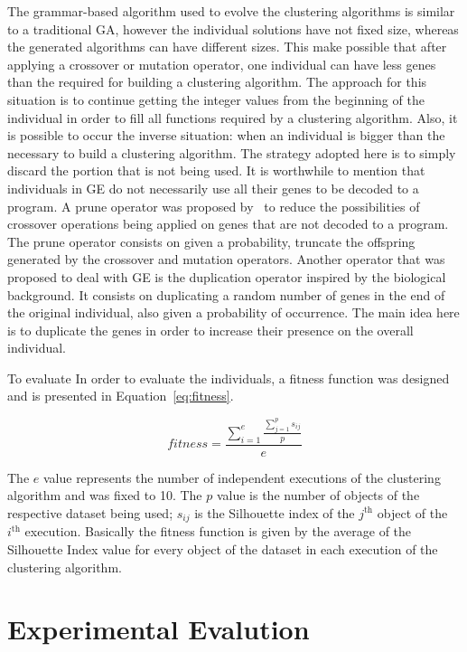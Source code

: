 \documentclass[conference,compsoc]{IEEEtran}
\begin{document}
The grammar-based algorithm used to evolve the clustering algorithms is similar to a traditional GA, however the individual solutions have not fixed size, whereas the generated algorithms can have different sizes. This make possible that after applying a crossover or mutation operator, one individual can have less genes than the required for building a clustering algorithm. The approach for this situation is to continue getting the integer values from the beginning of the individual in order to fill all functions required by a clustering algorithm. Also, it is possible to occur the inverse situation: when an individual is bigger than the necessary to build a clustering algorithm. The strategy adopted here is to simply discard the portion that is not being used. It is worthwhile to mention that individuals in GE do not necessarily use all their genes to be decoded to a program. A prune operator was proposed by~\cite{ryan1998grammatical} to reduce the possibilities of crossover operations being applied on genes that are not decoded to a program. The prune operator consists on given a probability, truncate the offspring generated by the crossover and mutation operators. Another operator that was proposed to deal with GE is the duplication operator inspired by the biological background. It consists on duplicating a random number of genes in the end of the original individual, also given a probability of occurrence. The main idea here is to duplicate the genes in order to increase their presence on the overall individual.


To evaluate In order to evaluate the individuals, a fitness function was designed and is presented in Equation~\ref{eq:fitness}.


\begin{equation} \label{eq:fitness}
	fitness = \frac{\sum_{i=1}^e \frac{\sum_{j=1}^{p} s_{ij}}{p}}{e}
\end{equation}


The $e$ value represents the number of independent executions of the clustering algorithm and was fixed to 10. The $p$ value is the number of objects of the respective dataset being used; $s_{ij}$ is the Silhouette index of the $j^{\text{th}}$ object of the $i^{\text{th}}$ execution. Basically the fitness function is given by the average of the Silhouette Index value for every object of the dataset in each execution of the clustering algorithm.


\section{Experimental Evalution} \label{sec:experiments}
\end{document}
